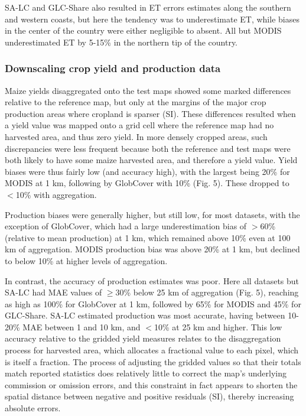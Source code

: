 \documentclass[12 pt, titlepage, a4paper]{article}
\begin{document}
SA-LC and GLC-Share also resulted in ET errors estimates along the southern and western coasts, but here the tendency was to underestimate ET, while biases in the center of the country were either negligible to absent.  All but MODIS underestimated ET by 5-15\% in the northern tip of the country.  


\vspace{-0.3 cm}
\subsubsection*{Downscaling crop yield and production data}
\vspace{-0.2 cm}
Maize yields disaggregated onto the test maps showed some marked differences relative to the reference map, but only at the margins of the major crop production areas where cropland is sparser (SI). These differences resulted when a yield value was mapped onto a grid cell where the reference map had no harvested area, and thus zero yield. In more densely cropped areas, such discrepancies were less frequent because both the reference and test maps were both likely to have some maize harvested area, and therefore a yield value.  Yield biases were thus fairly low (and accuracy high), with the largest being 20\% for MODIS at 1 km, following by GlobCover with 10\% (Fig. 5). These dropped to $<$10\% with aggregation.  

Production biases were generally higher, but still low, for most datasets, with the exception of GlobCover, which had a large underestimation bias of $>$60\% (relative to mean production) at 1 km, which remained above 10\% even at 100 km of aggregation. MODIS production bias was above 20\% at 1 km, but declined to below 10\% at higher levels of aggregation.  

In contrast, the accuracy of production estimates was poor. Here all datasets but SA-LC had MAE values of $\geq$30\% below 25 km of aggregation (Fig. 5), reaching as high as 100\% for GlobCover at 1 km, followed by 65\% for MODIS and 45\% for GLC-Share. SA-LC estimated production was most accurate, having between 10-20\% MAE between 1 and 10 km, and $<$10\% at 25 km and higher.  This low accuracy relative to the gridded yield measures relates to the disaggregation process for harvested area, which allocates a fractional value to each pixel, which is itself a fraction. The process of adjusting the gridded values so that their totals match reported statistics does relatively little to correct the map's underlying commission or omission errors, and this constraint in fact appears to shorten the spatial distance between negative and positive residuals (SI), thereby increasing absolute errors.  
\end{document}
